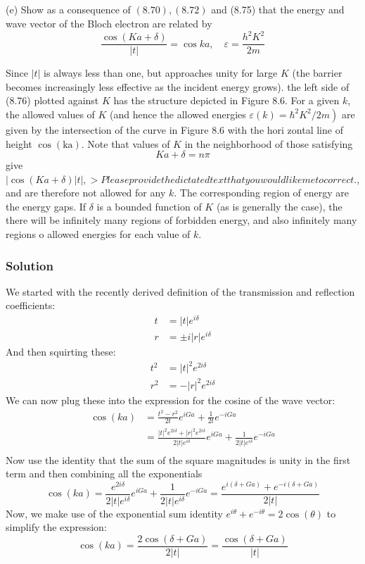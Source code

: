 \documentclass[12pt]{article}
\begin{document}
\subsection{}
(e) Show as a consequence of $(8.70),(8.72)$ and (8.75) that the energy and wave vector of the Bloch electron are related by
$$
\frac{\cos (K a+\delta)}{|t|}=\cos k a, \quad \varepsilon=\frac{h^2 K^2}{2 m}
$$

Since $|t|$ is always less than one, but approaches unity for large $K$ (the barrier becomes increasingly less effective as the incident energy grows). the left side of (8.76) plotted against $K$ has the structure depicted in Figure 8.6. For a given $k$, the allowed values of $K$ (and hence the allowed energies $\left.\varepsilon(k)=\hbar^2 K^2 / 2 m\right)$ are given by the intersection of the curve in Figure 8.6 with the hori zontal line of height $\cos (\mathrm{ka})$. Note that values of $K$ in the neighborhood of those satisfying
$$
K a+\delta=n \pi
$$
give $|\cos (K a+\delta)| t \mid,>Please provide the dictated text that you would like me to correct.$, and are therefore not allowed for any $k$. The corresponding region of energy are the energy gaps. If $\delta$ is a bounded function of $K$ (as is generally the case), the there will be infinitely many regions of forbidden energy, and also infinitely many regions o allowed energies for each value of $k$.
\subsubsection{Solution}
We started with the recently derived definition of the transmission and reflection coefficients:
\begin{align}
    t &= |t|e^{i\delta} \\
    r &= \pm i|r|e^{i\delta}
\end{align}
And then squirting these:
\begin{align}
    t^2 &= |t|^2e^{2i\delta} \\
    r^2 &= -|r|^2e^{2i\delta}
\end{align}
We can now plug these into the expression for the cosine of the wave vector:
\begin{align}
    \cos(ka) &= \frac{t^2 - r^2}{2t}e^{iGa} + \frac{1}{2t}e^{-iGa} \\
    &= \frac{|t|^2e^{2i\delta} + |r|^2e^{2i\delta}}{2|t|e^{i\delta}}e^{iGa} + \frac{1}{2|t|e^{i\delta}}e^{-iGa} \\
\end{align}
Now use the identity that the sum of the square magnitudes is unity in the first term and then combining all the exponentials
\begin{equation}
    \cos(ka) = \frac{e^{2i\delta}}{2|t|e^{i\delta}}e^{iGa} + \frac{1}{2|t|e^{i\delta}}e^{-iGa} = \frac{e^{i\left(\delta + Ga\right)} + e^{-i\left(\delta + Ga\right)}}{2|t|}
\end{equation}
Now, we make use of the exponential sum identity $e^{i\theta} + e^{-i\theta} = 2\cos(\theta)$ to simplify the expression:
\begin{equation}
    \cos(ka) = \frac{2\cos(\delta + Ga)}{2|t|} = \frac{\cos(\delta + Ga)}{|t|}
\end{equation}
\end{document}
